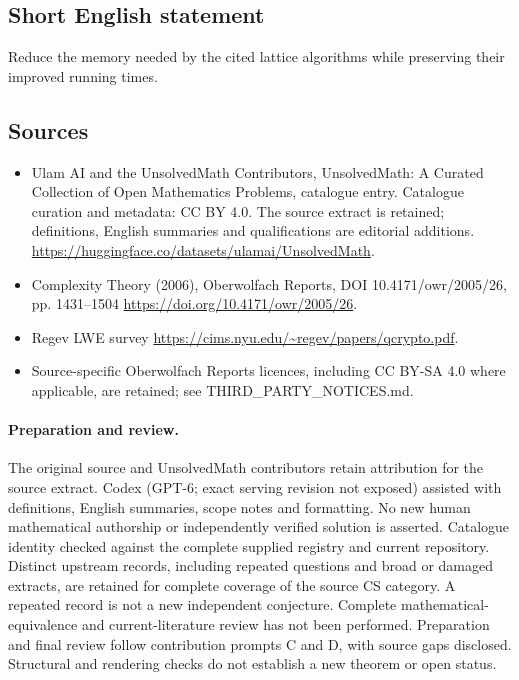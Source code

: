 \documentclass[11pt]{article}
\begin{document}
\subsection{Short English statement}
Reduce the memory needed by the cited lattice algorithms while preserving their improved running times.
\subsection{Sources}
\begin{itemize}
\item[\hypertarget{source:statement:1}{S1}] Ulam AI and the UnsolvedMath Contributors, UnsolvedMath: A Curated Collection of Open Mathematics Problems, catalogue entry. Catalogue curation and metadata: CC BY 4.0. The source extract is retained; definitions, English summaries and qualifications are editorial additions.
\url{https://huggingface.co/datasets/ulamai/UnsolvedMath}.
\item[\hypertarget{source:statement:2}{S2}] Complexity Theory (2006), Oberwolfach Reports, DOI 10.4171/owr/2005/26, pp. 1431--1504
\url{https://doi.org/10.4171/owr/2005/26}.
\item[\hypertarget{source:statement:3}{S3}] Regev LWE survey
\url{https://cims.nyu.edu/~regev/papers/qcrypto.pdf}.
\item Source-specific Oberwolfach Reports licences, including CC BY-SA 4.0 where applicable, are retained; see THIRD\_PARTY\_NOTICES.md.
\end{itemize}
\paragraph{Preparation and review.}
The original source and UnsolvedMath contributors retain attribution for the source extract. Codex (GPT-6; exact serving revision not exposed) assisted with definitions, English summaries, scope notes and formatting. No new human mathematical authorship or independently verified solution is asserted. Catalogue identity checked against the complete supplied registry and current repository. Distinct upstream records, including repeated questions and broad or damaged extracts, are retained for complete coverage of the source CS category. A repeated record is not a new independent conjecture. Complete mathematical-equivalence and current-literature review has not been performed. Preparation and final review follow contribution prompts C and D, with source gaps disclosed. Structural and rendering checks do not establish a new theorem or open status.
\label{end:statement}
\end{document}
